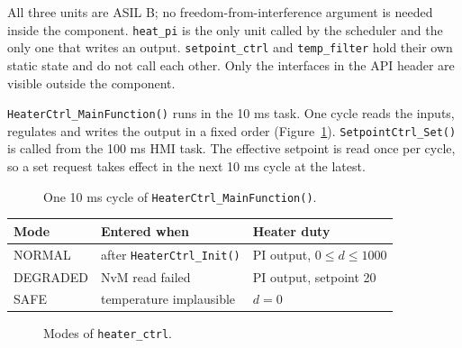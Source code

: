 %

\begin{StaticArchitecture}
All three units are ASIL B; no freedom-from-interference argument is needed
inside the component. \texttt{heat\_pi} is the only unit called by the
scheduler and the only one that writes an output. \texttt{setpoint\_ctrl} and
\texttt{temp\_filter} hold their own static state and do not call each other.
Only the interfaces in the API header are visible outside the component.
\end{StaticArchitecture}

\begin{DynamicBehavior}
\texttt{HeaterCtrl\_MainFunction()} runs in the 10 ms task. One cycle reads the
inputs, regulates and writes the output in a fixed order
(Figure~\ref{fig:main-cycle}). \texttt{SetpointCtrl\_Set()} is called from the
100 ms HMI task. The effective setpoint is read once per cycle, so a set
request takes effect in the next 10 ms cycle at the latest.

\begin{figure}[htbp]
  \centering
  \caption{One 10 ms cycle of \texttt{HeaterCtrl\_MainFunction()}.}
  \label{fig:main-cycle}
\end{figure}

\begin{center}
\begin{tabular}{lll}
  \toprule
  \textbf{Mode} & \textbf{Entered when} & \textbf{Heater duty} \\ \midrule
  NORMAL   & after \texttt{HeaterCtrl\_Init()} & PI output, $0 \le d \le 1000$ \\
  DEGRADED & NvM read failed                   & PI output, setpoint 20 \\
  SAFE     & temperature implausible           & $d = 0$ \\
  \bottomrule
\end{tabular}
\end{center}

\begin{figure}[htbp]
  \centering
  \caption{Modes of \texttt{heater\_ctrl}.}
  \label{fig:modes}
\end{figure}
\end{DynamicBehavior}

